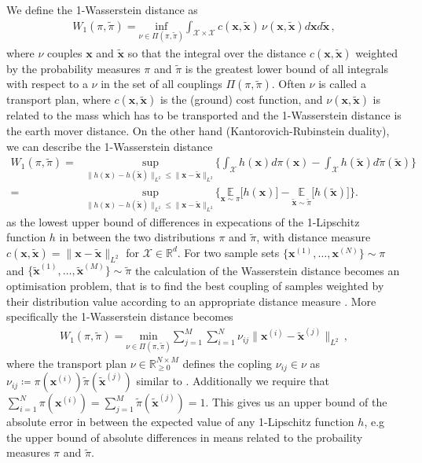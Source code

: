 We define the 1-Wasserstein distance as
\begin{align}
	W_1(\pi,\tilde{\pi}) = \underset{  \nu \in \Pi(\pi,\tilde{\pi}) }{ \text{inf}}\int_{\mathcal{X} \times \mathcal{X}} c(\bm{x},\tilde{\bm{x}}) \, \nu(\bm{x},\tilde{\bm{x}}) d\bm{x} d\tilde{\bm{x}}
	\label{eq:wass} \, ,
\end{align}
where $\nu$ couples $\bm{x}$ and $\tilde{\bm{x}}$ so that the integral over the distance $ c(\bm{x},\tilde{\bm{x}}) $ weighted by the probability measures $\pi$ and $\tilde{\pi}$ is the greatest lower bound of all integrals with respect to a $\nu$ in the set of all couplings $ \Pi(\pi,\tilde{\pi})$.
Often $\nu$ is called a transport plan, where $c(\bm{x},\tilde{\bm{x}})$ is the (ground) cost function, and $\nu(\bm{x}, \tilde{\bm{x}})$ is related to the mass which has to be transported and the 1-Wasserstein distance is the earth mover distance.
On the other hand (Kantorovich-Rubinstein duality), we can describe the 1-Wasserstein distance 
\begin{align}
	W_1(\pi,\tilde{\pi})  =& \underset{ \lVert h(\bm{x})- h(\tilde{\bm{x}}) \rVert_{L^2} \leq   \lVert \bm{x} - \tilde{\bm{x}}  \rVert_{L^2} }{ \text{sup}} \Bigg\{  \int_{\mathcal{X}} h(\bm{x}) d \pi (\bm{x})  - \int_{\mathcal{X}} h(\tilde{\bm{x}}) d \tilde{\pi} (\tilde{\bm{x}}) \Bigg\} \\
	=& \underset{ \lVert h(\bm{x})- h(\tilde{\bm{x}}) \rVert_{L^2} \leq \lVert \bm{x} -\tilde{\bm{x}}  \rVert_{L^2} }{ \text{sup}}  \Bigg\{  \underset{\bm{x} \sim  \pi }{\mathbb{E}} \big[ h(\bm{x}) \big]  -  \underset{\tilde{\bm{x}}\sim \tilde{\pi}}{\mathbb{E}} \big[ h(\tilde{\bm{x}}) \big] \Bigg\} .
\end{align}
as the lowest upper bound of differences in expecations of the 1-Lipschitz function $h$ in between the two distributions $\pi$ and $\tilde{\pi}$, with distance measure $c(\bm{x},\tilde{\bm{x}})= \lVert \bm{x} -\tilde{\bm{x}} \rVert_{L^2} $ for $\mathcal{X} \in \mathbb{R}^d$.
For two sample sets $\{ \bm{x}^{(1)},\dots,\bm{x}^{(N)}\} \sim \pi$ and $\{\tilde{ \bm{x}}^{(1)},\dots,\tilde{\bm{x}}^{(M)}\} \sim \tilde{\pi}$ the calculation of the Wasserstein distance becomes an optimisation problem, that is to find the best coupling of samples weighted by their distribution value according to an appropriate distance measure \cite{feydy2020OT}.
More specifically the 1-Wasserstein distance becomes
\begin{align}
W_1(\pi,\tilde{\pi}) = 	\underset{\nu \in \Pi(\pi,\tilde{\pi}) }{\text{min}} \sum^M_{j = 1} \sum^N_{i =1}  \nu_{ij} \lVert\bm{x}^{(i)}  -  \tilde{\bm{x}}^{(j)} \rVert_{L^2} \, ,
\end{align}
where the transport plan $\nu \in \mathbb{R}^{N \times M}_ {\geq 0}$ defines the copling $\nu_{ij} \in \nu $ as $ \nu_{ij} \coloneqq \pi(\bm{x}^{(i)}) \tilde{\pi}(\tilde{\bm{x}}^{(j)})$ similar to \cite[Eq. 3.166]{feydy2020OT}.
Additionally we require that $\sum^N_{i =1} \pi(\bm{x}^{(i)}) = \sum^M_{j = 1} \tilde{\pi}(\tilde{\bm{x}}^{(j)})= 1 $.
This gives us an upper bound of the absolute error in between the expected value of any 1-Lipschitz function $h$, e.g the upper bound of absolute differences in means related to the probaility measures $\pi$ and $\tilde{\pi}$. 

